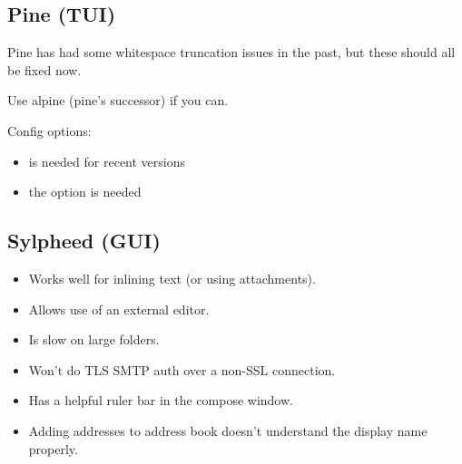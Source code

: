 \documentclass[a4paper,8pt,english]{sphinxmanual}
\begin{document}
\subsection{Pine (TUI)}
\label{process/email-clients:pine-tui}
Pine has had some whitespace truncation issues in the past, but these
should all be fixed now.

Use alpine (pine's successor) if you can.

Config options:
\begin{itemize}
\item {} 
 is needed for recent versions

\item {} 
the  option is needed

\end{itemize}


\subsection{Sylpheed (GUI)}
\label{process/email-clients:sylpheed-gui}\begin{itemize}
\item {} 
Works well for inlining text (or using attachments).

\item {} 
Allows use of an external editor.

\item {} 
Is slow on large folders.

\item {} 
Won't do TLS SMTP auth over a non-SSL connection.

\item {} 
Has a helpful ruler bar in the compose window.

\item {} 
Adding addresses to address book doesn't understand the display name
properly.

\end{itemize}
\end{document}
